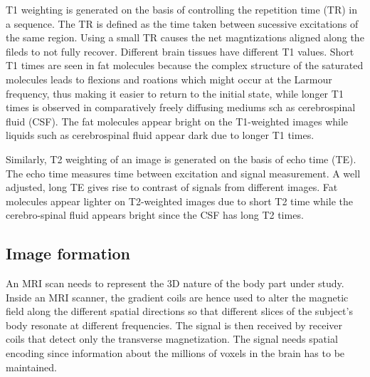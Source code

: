 \documentclass[msthesis.tex]{subfiles}
\begin{document}
T1 weighting is generated on the basis of controlling the repetition time (TR) in a sequence. The TR is defined as the time taken between sucessive excitations of the same region. Using a small TR causes the net magntizations aligned along the fileds to not fully recover. Different brain tissues have different T1 values. Short T1 times are seen in fat molecules because the complex structure of the saturated molecules leads to flexions and roations which might occur at the Larmour frequency, thus making it easier to return to the initial state, while longer T1 times is observed in comparatively freely diffusing mediums sch as cerebrospinal fluid (CSF). The fat molecules appear bright on the T1-weighted images while liquids such as cerebrospinal fluid appear dark due to longer T1 times.

Similarly, T2 weighting of an image is generated on the basis of echo time (TE). The echo time measures time between excitation and signal measurement. A well adjusted, long TE gives rise to contrast of signals from different images. Fat molecules appear lighter on T2-weighted images due to short T2 time while the cerebro-spinal fluid appears bright since the CSF has long T2 times.


\subsection{Image formation}

An MRI scan needs to represent the 3D nature of the body part under study. Inside an MRI scanner, the gradient coils are hence used to alter the magnetic field along the different spatial directions so that different slices of the subject’s body resonate at different frequencies. The signal is then received by receiver coils that detect only the transverse magnetization. The signal needs spatial encoding since information about the millions of voxels in the brain has to be maintained.
\end{document}
